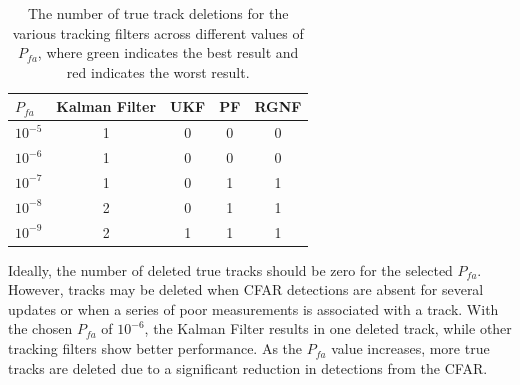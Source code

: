 \begin{table}[H]
    \centering
    \begin{tabular}{l c c c c}
        \toprule
        \textbf{\(P_{fa}\)} & \textbf{Kalman Filter} & \textbf{UKF} & \textbf{PF} & \textbf{RGNF} \\
        \midrule
        \(10^{-5}\) & 1                      & \cellcolor{bestcell}0 & \cellcolor{bestcell}0 & \cellcolor{bestcell}0 \\
        \(10^{-6}\) & 1                      & \cellcolor{bestcell}0 & \cellcolor{bestcell}0 & \cellcolor{bestcell}0 \\
        \(10^{-7}\) & 1                      & \cellcolor{bestcell}0 & 1                     & 1 \\
        \(10^{-8}\) & \cellcolor{worstcell}2 & \cellcolor{bestcell}0 & 1                     & 1 \\
        \(10^{-9}\) & \cellcolor{worstcell}2 & 1                     & 1                     & 1 \\
        \bottomrule
    \end{tabular}
    \caption{The number of true track deletions for the various tracking filters across
             different values of \(P_{fa}\), where green indicates
             the best result and red indicates the worst result.}
    \label{tab:Pttd}
\end{table}

Ideally, the number of deleted true tracks should be zero for the selected \(P_{fa}\). However, tracks may be deleted when \ac{CFAR} detections are absent for several updates or when a series of poor measurements is associated with a track. With the chosen \(P_{fa}\) of \(10^{-6}\), the Kalman Filter results in one deleted track, while other tracking filters show better performance. As the \(P_{fa}\) value increases, more true tracks are deleted due to a significant reduction in detections from the \ac{CFAR}.





